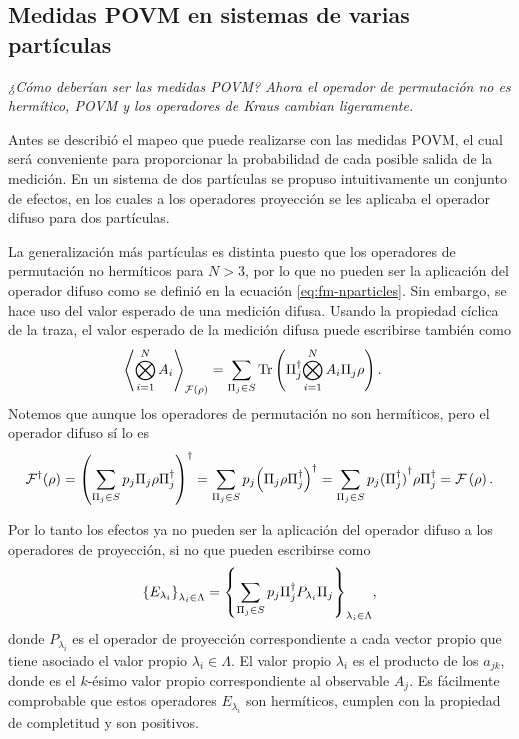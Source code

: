 \documentclass[12pt,oneside]{book}\raggedbottom{}
\begin{document}
\subsection*{Medidas POVM en sistemas de varias partículas}


\textit{¿Cómo deberían ser las medidas POVM\@? Ahora el operador de permutación no es hermítico, POVM y los operadores de Kraus cambian ligeramente.}

Antes se describió el mapeo que puede realizarse con las medidas POVM, el cual será conveniente para proporcionar la probabilidad de cada posible salida de la medición. En un sistema de dos partículas se propuso intuitivamente un conjunto de efectos, en los cuales a los operadores proyección se les aplicaba el operador difuso para dos partículas.


La generalización más partículas es distinta puesto que los operadores de permutación no hermíticos para $N>3$, por lo que no pueden ser la aplicación del operador difuso como se definió en la ecuación {\eqref{eq:fm-nparticles}}. Sin embargo, se hace uso del valor esperado de una medición difusa. Usando la propiedad cíclica de la traza, el valor esperado de la medición difusa puede escribirse también como \begin{equation}\label{eq:ExpectedValue-generalForm-2}\begin{split}
    \left \langle \bigotimes_{i=1}^{N} A_i\right \rangle_{\mathcal{F}(\rho)} &=\sum_{\Pi_j \in S}{\rm Tr} \left(\Pi_j^\dagger{\bigotimes_{i=1}^{N}A_i}\Pi_j\rho\right).
\end{split}
\end{equation} Notemos que aunque los operadores de permutación no son hermíticos, pero el operador difuso sí lo es \[\mathcal{F}^\dagger{(\rho)}={\left(\sum_{\Pi_j \in S} p_j \Pi_{j}\rho\Pi_{j}^{\dagger}\right)}^\dagger =\sum_{\Pi_j \in S} p_j{\left(\Pi_{j}\rho\Pi_{j}^{\dagger}\right)}^\dagger=\sum_{\Pi_j \in S} p_j {(\Pi_{j}^\dagger)}^\dagger \rho\Pi_{j}^\dagger= \mathcal{F}\left(\rho\right).\]

Por lo tanto los efectos ya no pueden ser la aplicación del operador difuso a los operadores de proyección, si no que pueden escribirse como \begin{equation}\label{eq:effectsSetNp}
    {\{E_{\lambda_i}\}}_{\lambda_i \in \Lambda}={\left\{\sum_{\Pi_j \in S} p_j \Pi_{j}^{\dagger}P_{\lambda_i}\Pi_{j}\right\}}_{\lambda_i \in \Lambda},
\end{equation}  
donde $P_{\lambda_i}$ es el operador de proyección correspondiente a cada vector propio que tiene asociado el valor propio $\lambda_i\in \Lambda$. %
El valor propio $\lambda_i$ es el producto de los $a_{jk}$, donde es el $k$-ésimo valor propio correspondiente al observable $A_j$. Es fácilmente comprobable que estos operadores $E_{\lambda_i}$ son hermíticos, cumplen con la propiedad de completitud y son positivos.
\end{document}
